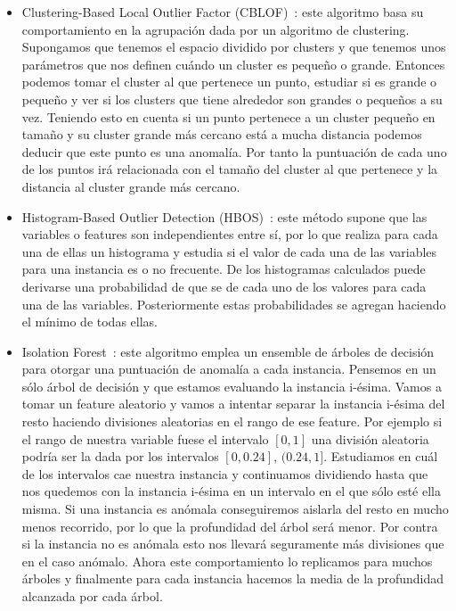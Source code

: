 \begin{itemize}
	\item Clustering-Based Local Outlier Factor (CBLOF)~\cite{he2003discovering}: este algoritmo basa su comportamiento en la agrupación dada por un algoritmo de clustering. Supongamos que tenemos el espacio dividido por clusters y que tenemos unos parámetros que nos definen cuándo un cluster es pequeño o grande. Entonces podemos tomar el cluster al que pertenece un punto, estudiar si es grande o pequeño y ver si los clusters que tiene alrededor son grandes o pequeños a su vez. Teniendo esto en cuenta si un punto pertenece a un cluster pequeño en tamaño y su cluster grande más cercano está a mucha distancia podemos deducir que este punto es una anomalía. Por tanto la puntuación de cada uno de los puntos irá relacionada con el tamaño del cluster al que pertenece y la distancia al cluster grande más cercano.
	\item Histogram-Based Outlier Detection (HBOS)~\cite{hbos}: este método supone que las variables o features son independientes entre sí, por lo que realiza para cada una de ellas un histograma y estudia si el valor de cada una de las variables para una instancia es o no frecuente. De los histogramas calculados puede derivarse una probabilidad de que se de cada uno de los valores para cada una de las variables. Posteriormente estas probabilidades se agregan haciendo el mínimo de todas ellas.
	\item Isolation Forest~\cite{liu2008isolation}: este algoritmo emplea un ensemble de árboles de decisión para otorgar una puntuación de anomalía a cada instancia. Pensemos en un sólo árbol de decisión y que estamos evaluando la instancia i-ésima. Vamos a tomar un feature aleatorio y vamos a intentar separar la instancia i-ésima del resto haciendo divisiones aleatorias en el rango de ese feature. Por ejemplo si el rango de nuestra variable fuese el intervalo $[0,1]$ una división aleatoria podría ser la dada por los intervalos $[0,0.24]$, $(0.24,1]$. Estudiamos en cuál de los intervalos cae nuestra instancia y continuamos dividiendo hasta que nos quedemos con la instancia i-ésima en un intervalo en el que sólo esté ella misma. Si una instancia es anómala conseguiremos aislarla del resto en mucho menos recorrido, por lo que la profundidad del árbol será menor. Por contra si la instancia no es anómala esto nos llevará seguramente más divisiones que en el caso anómalo. Ahora este comportamiento lo replicamos para muchos árboles y finalmente para cada instancia hacemos la media de la profundidad alcanzada por cada árbol.

\end{itemize}
